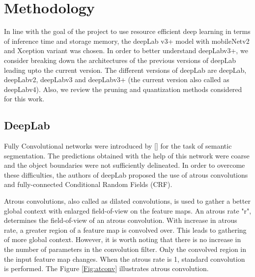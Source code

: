\chapter{Methodology}

In line with the goal of the project to use resource efficient deep learning in terms of inference time and storage memory, the deepLab v3+ model with mobileNetv2 and Xception variant was chosen. In order to better understand deepLabv3+, we consider breaking down the architectures of the previous versions of deepLab leading upto the current version. The different versions of deepLab are deepLab, deepLabv2, deepLabv3 and deepLabv3+ (the current version also called as deepLabv4). Also, we review the pruning and quantization methods considered for this work.

\section{DeepLab}

Fully Convolutional networks were introduced by [] for the task of semantic segmentation. The predictions obtained with the help of this network were coarse and the object boundaries were not sufficiently delineated. In order to overcome these difficulties, the authors of deepLab proposed the use of atrous convolutions and fully-connected Conditional Random Fields (CRF).

Atrous convolutions, also called as dilated convolutions, is used to gather a better global context with enlarged field-of-view on the feature maps. An atrous rate "r", determines the field-of-view of an atrous convolution. With increase in atrous rate, a greater region of a feature map is convolved over. This leads to gathering of more global context. However, it is worth noting that there is no increase in the number of parameters in the convolution filter. Only the convolved region in the input feature map changes. When the atrous rate is 1, standard convolution is performed. The Figure \ref{Fig:atconv} illustrates atrous convolution. 

